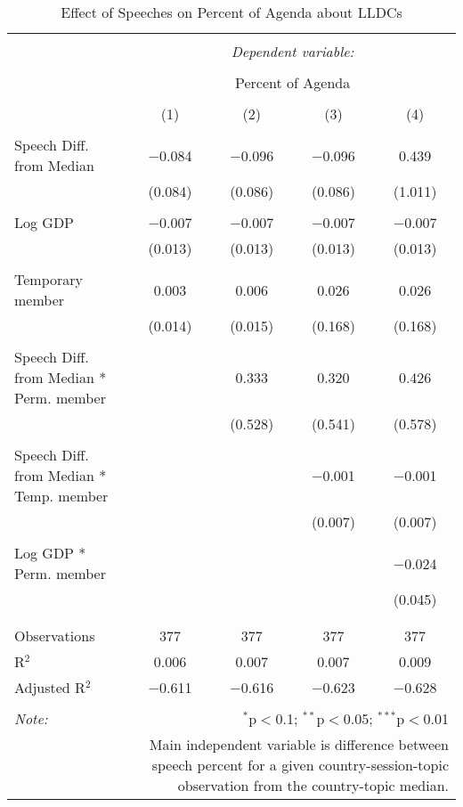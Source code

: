
\begin{table}[!htbp] \centering 
  \caption{Effect of Speeches on Percent of Agenda about  LLDCs} 
  \label{} 
\begin{tabular}{@{\extracolsep{5pt}}lcccc} 
\\[-1.8ex]\hline 
\hline \\[-1.8ex] 
 & \multicolumn{4}{c}{\textit{Dependent variable:}} \\ 
\cline{2-5} 
\\[-1.8ex] & \multicolumn{4}{c}{Percent of Agenda} \\ 
\\[-1.8ex] & (1) & (2) & (3) & (4)\\ 
\hline \\[-1.8ex] 
 Speech Diff. from Median & $-$0.084 & $-$0.096 & $-$0.096 & 0.439 \\ 
  & (0.084) & (0.086) & (0.086) & (1.011) \\ 
  & & & & \\ 
 Log GDP & $-$0.007 & $-$0.007 & $-$0.007 & $-$0.007 \\ 
  & (0.013) & (0.013) & (0.013) & (0.013) \\ 
  & & & & \\ 
 Temporary member & 0.003 & 0.006 & 0.026 & 0.026 \\ 
  & (0.014) & (0.015) & (0.168) & (0.168) \\ 
  & & & & \\ 
 Speech Diff. from Median * Perm. member &  & 0.333 & 0.320 & 0.426 \\ 
  &  & (0.528) & (0.541) & (0.578) \\ 
  & & & & \\ 
 Speech Diff. from Median * Temp. member &  &  & $-$0.001 & $-$0.001 \\ 
  &  &  & (0.007) & (0.007) \\ 
  & & & & \\ 
 Log GDP * Perm. member &  &  &  & $-$0.024 \\ 
  &  &  &  & (0.045) \\ 
  & & & & \\ 
\hline \\[-1.8ex] 
Observations & 377 & 377 & 377 & 377 \\ 
R$^{2}$ & 0.006 & 0.007 & 0.007 & 0.009 \\ 
Adjusted R$^{2}$ & $-$0.611 & $-$0.616 & $-$0.623 & $-$0.628 \\ 
\hline 
\hline \\[-1.8ex] 
\textit{Note:}  & \multicolumn{4}{r}{$^{*}$p$<$0.1; $^{**}$p$<$0.05; $^{***}$p$<$0.01} \\ 
 & \multicolumn{4}{r}{Main independent variable is difference between speech percent for a given country-session-topic observation from the country-topic median.} \\ 
\end{tabular} 
\end{table} 
